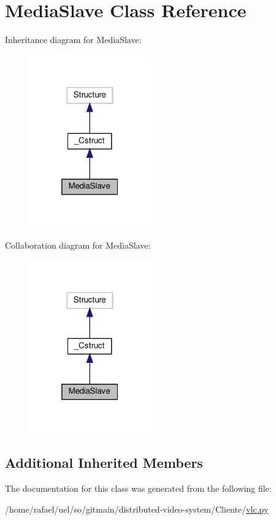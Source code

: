 \hypertarget{classvlc_1_1_media_slave}{}\section{Media\+Slave Class Reference}
\label{classvlc_1_1_media_slave}


Inheritance diagram for Media\+Slave\+:
\nopagebreak
\begin{figure}[H]
\begin{center}
\leavevmode
\includegraphics[width=148pt]{classvlc_1_1_media_slave__inherit__graph}
\end{center}
\end{figure}


Collaboration diagram for Media\+Slave\+:
\nopagebreak
\begin{figure}[H]
\begin{center}
\leavevmode
\includegraphics[width=148pt]{classvlc_1_1_media_slave__coll__graph}
\end{center}
\end{figure}
\subsection*{Additional Inherited Members}


The documentation for this class was generated from the following file\+:\begin{DoxyCompactItemize}
\item 
/home/rafael/uel/so/gitmain/distributed-\/video-\/system/\+Cliente/\hyperlink{vlc_8py}{vlc.\+py}\end{DoxyCompactItemize}
